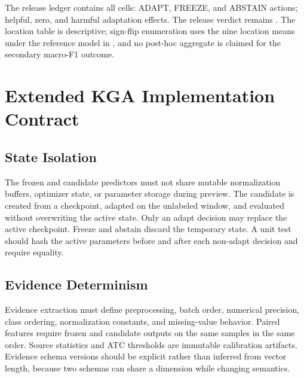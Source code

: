 \begin{table}[t]
\centering
\footnotesize
\caption{Complete locked CCT-20 location ledger. A/F/U denotes ADAPT/FREEZE/ABSTAIN, and $+/0/-$
counts positive/zero/negative measured-benefit cells. Difference columns are equal-weight means over five checkpoint
cells and are rounded to four decimals for display; the sealed manifest retains full precision.
Cells are repeated-model observations, and the inferential cluster unit is the camera location.}
\label{tab:cct20-locations}

\end{table}

The release ledger contains all \CCTCellCount{} cells: \CCTAdaptCount{} ADAPT, \CCTFreezeCount{}
FREEZE, and \CCTAbstainCount{} ABSTAIN actions; \CCTHelpfulCount{} helpful, \CCTZeroCount{} zero,
and \CCTHarmfulCount{} harmful adaptation effects. The release verdict remains \CCTVerdict. The
location table is descriptive; sign-flip enumeration uses the nine location means under the
reference model in , and no post-hoc
aggregate is claimed for the secondary macro-F1 outcome.

\section{Extended KGA Implementation Contract}
\label{app:compact-implementation}

\subsection{State Isolation}

The frozen and candidate predictors must not share mutable normalization buffers, optimizer state,
or parameter storage during preview. The candidate is created from a checkpoint, adapted on the
unlabeled window, and evaluated without overwriting the active state. Only an adapt decision may
replace the active checkpoint. Freeze and abstain discard the temporary state. A unit test should
hash the active parameters before and after each non-adapt decision and require equality.

\subsection{Evidence Determinism}

Evidence extraction must define preprocessing, batch order, numerical precision, class ordering,
normalization constants, and missing-value behavior. Paired features require frozen and candidate
outputs on the same samples in the same order. Source statistics and ATC thresholds are immutable
calibration artifacts. Evidence schema versions should be explicit rather than inferred from vector
length, because two schemas can share a dimension while changing semantics.

